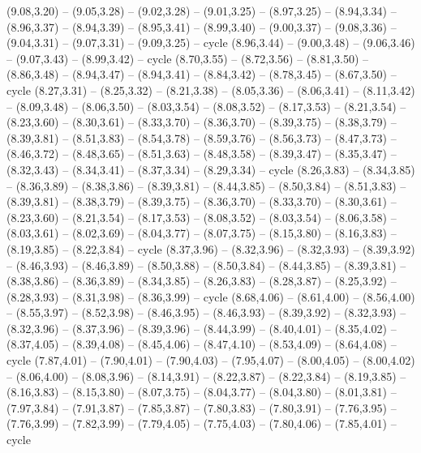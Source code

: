 \expandafter\def\csname geo:gebiet:BGD\endcsname{
  (9.08,3.20) -- (9.05,3.28) -- (9.02,3.28) -- (9.01,3.25) -- (8.97,3.25) -- (8.94,3.34) -- (8.96,3.37) -- (8.94,3.39) -- (8.95,3.41) -- (8.99,3.40) -- (9.00,3.37) -- (9.08,3.36) -- (9.04,3.31) -- (9.07,3.31) -- (9.09,3.25) -- cycle}
\expandafter\def\csname geo:gebiet:BTN\endcsname{
  (8.96,3.44) -- (9.00,3.48) -- (9.06,3.46) -- (9.07,3.43) -- (8.99,3.42) -- cycle}
\expandafter\def\csname geo:gebiet:NPL\endcsname{
  (8.70,3.55) -- (8.72,3.56) -- (8.81,3.50) -- (8.86,3.48) -- (8.94,3.47) -- (8.94,3.41) -- (8.84,3.42) -- (8.78,3.45) -- (8.67,3.50) -- cycle}
\expandafter\def\csname geo:gebiet:PAK\endcsname{
  (8.27,3.31) -- (8.25,3.32) -- (8.21,3.38) -- (8.05,3.36) -- (8.06,3.41) -- (8.11,3.42) -- (8.09,3.48) -- (8.06,3.50) -- (8.03,3.54) -- (8.08,3.52) -- (8.17,3.53) -- (8.21,3.54) -- (8.23,3.60) -- (8.30,3.61) -- (8.33,3.70) -- (8.36,3.70) -- (8.39,3.75) -- (8.38,3.79) -- (8.39,3.81) -- (8.51,3.83) -- (8.54,3.78) -- (8.59,3.76) -- (8.56,3.73) -- (8.47,3.73) -- (8.46,3.72) -- (8.48,3.65) -- (8.51,3.63) -- (8.48,3.58) -- (8.39,3.47) -- (8.35,3.47) -- (8.32,3.43) -- (8.34,3.41) -- (8.37,3.34) -- (8.29,3.34) -- cycle}
\expandafter\def\csname geo:gebiet:AFG\endcsname{
  (8.26,3.83) -- (8.34,3.85) -- (8.36,3.89) -- (8.38,3.86) -- (8.39,3.81) -- (8.44,3.85) -- (8.50,3.84) -- (8.51,3.83) -- (8.39,3.81) -- (8.38,3.79) -- (8.39,3.75) -- (8.36,3.70) -- (8.33,3.70) -- (8.30,3.61) -- (8.23,3.60) -- (8.21,3.54) -- (8.17,3.53) -- (8.08,3.52) -- (8.03,3.54) -- (8.06,3.58) -- (8.03,3.61) -- (8.02,3.69) -- (8.04,3.77) -- (8.07,3.75) -- (8.15,3.80) -- (8.16,3.83) -- (8.19,3.85) -- (8.22,3.84) -- cycle}
\expandafter\def\csname geo:gebiet:TJK\endcsname{
  (8.37,3.96) -- (8.32,3.96) -- (8.32,3.93) -- (8.39,3.92) -- (8.46,3.93) -- (8.46,3.89) -- (8.50,3.88) -- (8.50,3.84) -- (8.44,3.85) -- (8.39,3.81) -- (8.38,3.86) -- (8.36,3.89) -- (8.34,3.85) -- (8.26,3.83) -- (8.28,3.87) -- (8.25,3.92) -- (8.28,3.93) -- (8.31,3.98) -- (8.36,3.99) -- cycle}
\expandafter\def\csname geo:gebiet:KGZ\endcsname{
  (8.68,4.06) -- (8.61,4.00) -- (8.56,4.00) -- (8.55,3.97) -- (8.52,3.98) -- (8.46,3.95) -- (8.46,3.93) -- (8.39,3.92) -- (8.32,3.93) -- (8.32,3.96) -- (8.37,3.96) -- (8.39,3.96) -- (8.44,3.99) -- (8.40,4.01) -- (8.35,4.02) -- (8.37,4.05) -- (8.39,4.08) -- (8.45,4.06) -- (8.47,4.10) -- (8.53,4.09) -- (8.64,4.08) -- cycle}
\expandafter\def\csname geo:gebiet:TKM\endcsname{
  (7.87,4.01) -- (7.90,4.01) -- (7.90,4.03) -- (7.95,4.07) -- (8.00,4.05) -- (8.00,4.02) -- (8.06,4.00) -- (8.08,3.96) -- (8.14,3.91) -- (8.22,3.87) -- (8.22,3.84) -- (8.19,3.85) -- (8.16,3.83) -- (8.15,3.80) -- (8.07,3.75) -- (8.04,3.77) -- (8.04,3.80) -- (8.01,3.81) -- (7.97,3.84) -- (7.91,3.87) -- (7.85,3.87) -- (7.80,3.83) -- (7.80,3.91) -- (7.76,3.95) -- (7.76,3.99) -- (7.82,3.99) -- (7.79,4.05) -- (7.75,4.03) -- (7.80,4.06) -- (7.85,4.01) -- cycle}
